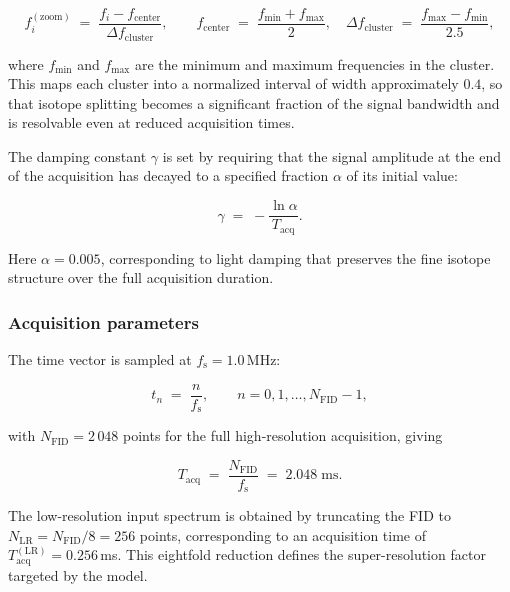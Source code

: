\documentclass[12pt,a4paper]{report}
\begin{document}
\begin{equation}
  f_i^{\mathrm{(zoom)}} \;=\;
  \frac{f_i - f_{\mathrm{center}}}{\Delta f_{\mathrm{cluster}}},
  \qquad
  f_{\mathrm{center}} \;=\; \frac{f_{\min}+f_{\max}}{2},
  \quad
  \Delta f_{\mathrm{cluster}} \;=\;
  \frac{f_{\max} - f_{\min}}{2.5},
  \label{eq:freq_zoom}
\end{equation}

where $f_{\min}$ and $f_{\max}$ are the minimum and maximum frequencies in the
cluster.  This maps each cluster into a normalized interval of width
approximately $0.4$, so that isotope splitting becomes a significant fraction of
the signal bandwidth and is resolvable even at reduced acquisition times.

The damping constant $\gamma$ is set by requiring that the signal amplitude at
the end of the acquisition has decayed to a specified fraction $\alpha$ of its
initial value:

\begin{equation}
  \gamma \;=\; -\frac{\ln \alpha}{T_{\mathrm{acq}}}.
  \label{eq:damping}
\end{equation}

Here $\alpha = 0.005$, corresponding to light damping that preserves the fine
isotope structure over the full acquisition duration.

\subsubsection{Acquisition parameters}
The time vector is sampled at $f_{\mathrm{s}} = 1.0\,$MHz:

\begin{equation}
  t_n \;=\; \frac{n}{f_{\mathrm{s}}}, \qquad
  n = 0, 1, \dots, N_{\mathrm{FID}}-1,
\end{equation}

with $N_{\mathrm{FID}} = 2\,048$ points for the full high-resolution
acquisition, giving

\begin{equation}
  T_{\mathrm{acq}} \;=\; \frac{N_{\mathrm{FID}}}{f_{\mathrm{s}}}
  \;=\; 2.048\;\mathrm{ms}.
\end{equation}

The low-resolution input spectrum is obtained by truncating the FID to
$N_{\mathrm{LR}} = N_{\mathrm{FID}} / 8 = 256$ points, corresponding to an
acquisition time of $T_{\mathrm{acq}}^{\mathrm{(LR)}} = 0.256\,$ms.  This
eightfold reduction defines the super-resolution factor targeted by the model.
\end{document}

